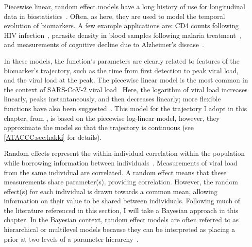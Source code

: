\documentclass[thesis.tex]{subfiles}
\begin{document}
Piecewise linear, random effect models have a long history of use for longitudinal data in biostatistics~\autocites{slateStatistical}.
Often, as here, they are used to model the temporal evolution of biomarkers.
A few example applications are: CD4 counts following HIV infection~\autocites{langeHierarchical,lynchPredicting}, parasite density in blood samples following malaria treatment~\autocites{fogartyBayesian}, and measurements of cognitive decline due to Alzheimer's disease~\autocites{bealisleBayesian}.

In these models, the function's parameters are clearly related to features of the biomarker's trajectory, such as the time from first detection to peak viral load, and the viral load at the peak.
The piecewise linear model is the most common in the context of SARS-CoV-2 viral load~\autocites{clearyUsing,kisslerViral,larremoreTest}
Here, the logarithm of viral load increases linearly, peaks instantaneously, and then decreases linearly; more flexible functions have also been suggested~\autocites{quiltyQuarantine}.
This model for the trajectory I adopt in this chapter, from \textcite{hakkiOnset}, is based on the piecewise log-linear model, however, they approximate the model so that the trajectory is continuous (see \cref{ATACCC:sec:hakki} for details).

Random effects represent the within-individual correlation within the population while borrowing information between individuals~\autocite[chapter 24]{lashModern}.
Measurements of viral load from the same individual are correlated.
A random effect means that these measurements share parameter(s), providing correlation.
However, the random effect(s) for each individual is drawn towards a common mean, allowing information on their value to be shared between individuals.
Following much of the literature referenced in this section, I will take a Bayesian approach in this chapter.
In the Bayesian context, random effect models are often referred to as hierarchical or multilevel models because they can be interpreted as placing a prior at two levels of a parameter hierarchy~\autocite[chapter 5]{gelmanBDA}.
\end{document}
